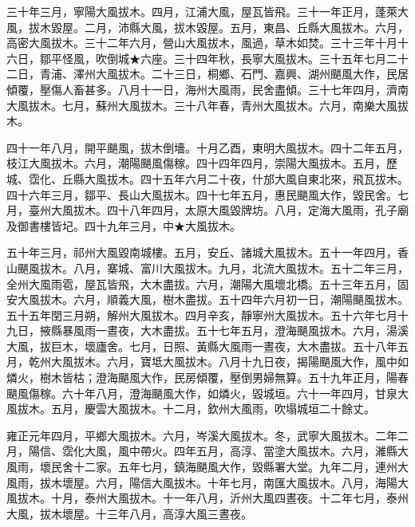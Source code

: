 \begin{pinyinscope}
三十年三月，寧陽大風拔木。四月，江浦大風，屋瓦皆飛。三十一年正月，蓬萊大風，拔木毀屋。二月，沛縣大風，拔木毀屋。五月，東昌、丘縣大風拔木。六月，高密大風拔木。三十二年六月，營山大風拔木，風過，草木如焚。三十三年十月十六日，鄒平怪風，吹倒城★六座。三十四年秋，長寧大風拔木。三十五年七月二十二日，青浦、澤州大風拔木。二十三日，桐鄉、石門、嘉興、湖州颶風大作，民居傾覆，壓傷人畜甚多。八月十一日，海州大風雨，民舍盡傾。三十七年四月，濟南大風拔木。七月，蘇州大風拔木。三十八年春，青州大風拔木。六月，南樂大風拔木。

四十一年八月，開平颶風，拔木倒墻。十月乙酉，東明大風拔木。四十二年五月，枝江大風拔木。六月，潮陽颶風傷稼。四十四年四月，崇陽大風拔木。五月，歷城、霑化、丘縣大風拔木。四十五年六月二十夜，什邡大風自東北來，飛瓦拔木。四十六年三月，鄒平、長山大風拔木。四十七年五月，惠民颶風大作，毀民舍。七月，臺州大風拔木。四十八年四月，太原大風毀牌坊。八月，定海大風雨，孔子廟及御書樓皆圮。四十九年三月，中★大風拔木。

五十年三月，祁州大風毀南城樓。五月，安丘、諸城大風拔木。五十一年四月，香山颶風拔木。八月，寨城、富川大風拔木。九月，北流大風拔木。五十二年三月，全州大風雨雹，屋瓦皆飛，大木盡拔。六月，潮陽大風壞北橋。五十三年五月，固安大風拔木。六月，順義大風，樹木盡拔。五十四年六月初一日，潮陽颶風拔木。五十五年閏三月朔，解州大風拔木。四月辛亥，靜寧州大風拔木。五十六年七月十九日，掖縣暴風雨一晝夜，大木盡拔。五十七年五月，澄海颶風拔木。六月，湯溪大風，拔巨木，壞廬舍。七月，日照、黃縣大風雨一晝夜，大木盡拔。五十八年五月，乾州大風拔木。六月，寶坻大風拔木。八月十九日夜，揭陽颶風大作，風中如燐火，樹木皆枯；澄海颶風大作，民房傾覆，壓倒男婦無算。五十九年正月，陽春颶風傷稼。六十年八月，澄海颶風大作，如燐火，毀城垣。六十一年四月，甘泉大風拔木。五月，慶雲大風拔木。十二月，欽州大風雨，吹塌城垣二十餘丈。

雍正元年四月，平鄉大風拔木。六月，岑溪大風拔木。冬，武寧大風拔木。二年二月，陽信、霑化大風，風中帶火。四年五月，高淳、當塗大風拔木。六月，濰縣大風雨，壞民舍十二家。五年七月，鎮海颶風大作，毀縣署大堂。九年二月，連州大風雨，拔木壞屋。六月，陽信大風拔木。十年七月，南匯大風拔木。八月，海陽大風拔木。十月，泰州大風拔木。十一年八月，沂州大風四晝夜。十二年七月，泰州大風，拔木壞屋。十三年八月，高淳大風三晝夜。


\end{pinyinscope}
